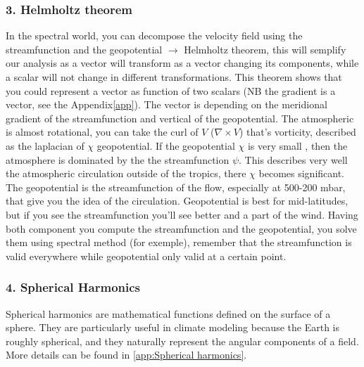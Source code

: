 \subsubsection{3. Helmholtz theorem}
In the spectral world, you can decompose the velocity field using the streamfunction and the geopotential $\rightarrow$ Helmholtz theorem, this will semplify our analysis as a  vector will transform as a vector changing its components, while a scalar will not change in different transformations. This theorem shows that you could represent a vector as function of two scalars (NB the gradient is a vector, see the Appendix\ref{app}). The vector is depending on the meridional gradient of the streamfunction and vertical of the geopotential. The atmospheric is almost rotational, you can take the curl of $V$ ($\nabla \times V$) that's vorticity, described as the laplacian of $\chi$ geopotential. If the geopotential $\chi$ is very small , then the atmosphere is dominated by the the streamfunction $\psi$. This describes very well the atmospheric circulation outside of the tropics, there $\chi$ becomes significant. The geopotential is the streamfunction of the flow, especially at 500-200 mbar, that give you the idea of the circulation. Geopotential is best for mid-latitudes, but if you see the streamfunction you'll see better and a part of the wind. Having both component you compute the streamfunction and the geopotential, you solve them using spectral method (for exemple), remember that the streamfunction is valid everywhere while geopotential only valid at a certain point.
\subsubsection{4. Spherical Harmonics}

Spherical harmonics are mathematical functions defined on the surface of a sphere. They are particularly useful in climate modeling because the Earth is roughly spherical, and they naturally represent the angular components of a field. More details can be found in \ref{app:Spherical harmonics}.

